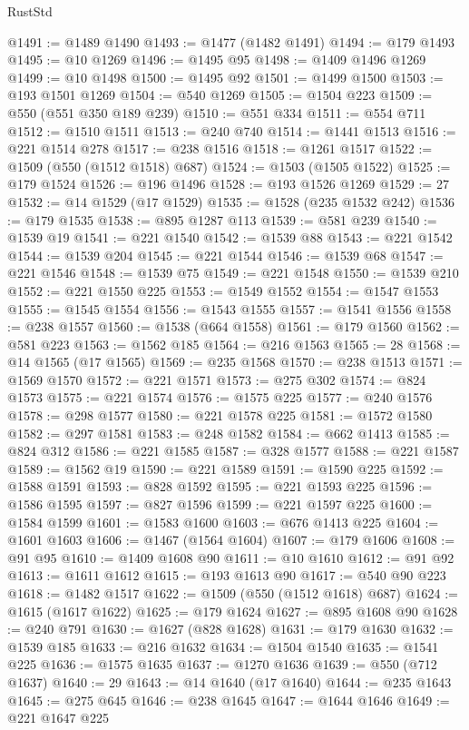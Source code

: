 \begin{lexlean}{RustStd}
\begin{coremodule}
@1491 := @1489 @1490
@1493 := @1477 (@1482 @1491)
@1494 := @179 @1493
@1495 := @10 @1269
@1496 := @1495 @95
@1498 := @1409 @1496 @1269
@1499 := @10 @1498
@1500 := @1495 @92
@1501 := @1499 @1500
@1503 := @193 @1501 @1269
@1504 := @540 @1269
@1505 := @1504 @223
@1509 := @550 (@551 @350 @189 @239)
@1510 := @551 @334
@1511 := @554 @711
@1512 := @1510 @1511
@1513 := @240 @740
@1514 := @1441 @1513
@1516 := @221 @1514 @278
@1517 := @238 @1516
@1518 := @1261 @1517
@1522 := @1509 (@550 (@1512 @1518) @687)
@1524 := @1503 (@1505 @1522)
@1525 := @179 @1524
@1526 := @196 @1496
@1528 := @193 @1526 @1269
@1529 := 27
@1532 := @14 @1529 (@17 @1529)
@1535 := @1528 (@235 @1532 @242)
@1536 := @179 @1535
@1538 := @895 @1287 @113
@1539 := @581 @239
@1540 := @1539 @19
@1541 := @221 @1540
@1542 := @1539 @88
@1543 := @221 @1542
@1544 := @1539 @204
@1545 := @221 @1544
@1546 := @1539 @68
@1547 := @221 @1546
@1548 := @1539 @75
@1549 := @221 @1548
@1550 := @1539 @210
@1552 := @221 @1550 @225
@1553 := @1549 @1552
@1554 := @1547 @1553
@1555 := @1545 @1554
@1556 := @1543 @1555
@1557 := @1541 @1556
@1558 := @238 @1557
@1560 := @1538 (@664 @1558)
@1561 := @179 @1560
@1562 := @581 @223
@1563 := @1562 @185
@1564 := @216 @1563
@1565 := 28
@1568 := @14 @1565 (@17 @1565)
@1569 := @235 @1568
@1570 := @238 @1513
@1571 := @1569 @1570
@1572 := @221 @1571
@1573 := @275 @302
@1574 := @824 @1573
@1575 := @221 @1574
@1576 := @1575 @225
@1577 := @240 @1576
@1578 := @298 @1577
@1580 := @221 @1578 @225
@1581 := @1572 @1580
@1582 := @297 @1581
@1583 := @248 @1582
@1584 := @662 @1413
@1585 := @824 @312
@1586 := @221 @1585
@1587 := @328 @1577
@1588 := @221 @1587
@1589 := @1562 @19
@1590 := @221 @1589
@1591 := @1590 @225
@1592 := @1588 @1591
@1593 := @828 @1592
@1595 := @221 @1593 @225
@1596 := @1586 @1595
@1597 := @827 @1596
@1599 := @221 @1597 @225
@1600 := @1584 @1599
@1601 := @1583 @1600
@1603 := @676 @1413 @225
@1604 := @1601 @1603
@1606 := @1467 (@1564 @1604)
@1607 := @179 @1606
@1608 := @91 @95
@1610 := @1409 @1608 @90
@1611 := @10 @1610
@1612 := @91 @92
@1613 := @1611 @1612
@1615 := @193 @1613 @90
@1617 := @540 @90 @223
@1618 := @1482 @1517
@1622 := @1509 (@550 (@1512 @1618) @687)
@1624 := @1615 (@1617 @1622)
@1625 := @179 @1624
@1627 := @895 @1608 @90
@1628 := @240 @791
@1630 := @1627 (@828 @1628)
@1631 := @179 @1630
@1632 := @1539 @185
@1633 := @216 @1632
@1634 := @1504 @1540
@1635 := @1541 @225
@1636 := @1575 @1635
@1637 := @1270 @1636
@1639 := @550 (@712 @1637)
@1640 := 29
@1643 := @14 @1640 (@17 @1640)
@1644 := @235 @1643
@1645 := @275 @645
@1646 := @238 @1645
@1647 := @1644 @1646
@1649 := @221 @1647 @225

\end{coremodule}
\end{lexlean}
